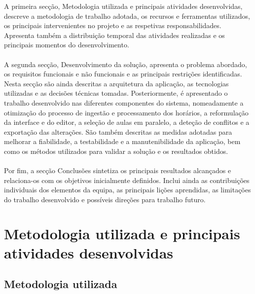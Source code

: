 \documentclass[10pt]{article}
\begin{document}
	A primeira secção, Metodologia utilizada e principais atividades desenvolvidas, descreve a metodologia de trabalho adotada, os recursos e ferramentas utilizados, os principais intervenientes no projeto e as respetivas responsabilidades. Apresenta também a distribuição temporal das atividades realizadas e os principais momentos do desenvolvimento.\\
    \\
    A segunda secção, Desenvolvimento da solução, apresenta o problema abordado, os requisitos funcionais e não funcionais e as principais restrições identificadas. Nesta secção são ainda descritas a arquitetura da aplicação, as tecnologias utilizadas e as decisões técnicas tomadas. Posteriormente, é apresentado o trabalho desenvolvido nas diferentes componentes do sistema, nomeadamente a otimização do processo de ingestão e processamento dos horários, a reformulação da interface e do editor, a seleção de aulas em paralelo, a deteção de conflitos e a exportação das alterações. São também descritas as medidas adotadas para melhorar a fiabilidade, a testabilidade e a manutenibilidade da aplicação, bem como os métodos utilizados para validar a solução e os resultados obtidos.\\
    \\
    Por fim, a secção Conclusões sintetiza os principais resultados alcançados e relaciona-os com os objetivos inicialmente definidos. Inclui ainda as contribuições individuais dos elementos da equipa, as principais lições aprendidas, as limitações do trabalho desenvolvido e possíveis direções para trabalho futuro.


\section{Metodologia utilizada e principais atividades desenvolvidas}

\subsection{Metodologia utilizada}
\end{document}
